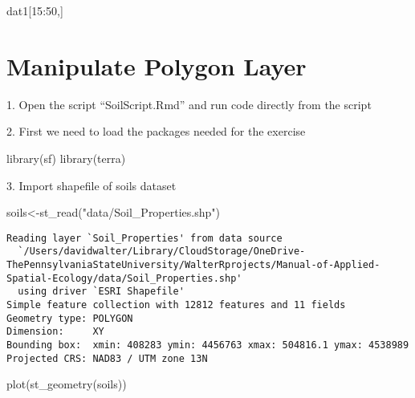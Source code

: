 \documentclass[
  letterpaper,
]{book}
\newenvironment{Shaded}{\begin{snugshade}}{\end{snugshade}}
\newcommand{\DecValTok}[1]{\textcolor[rgb]{0.68,0.00,0.00}{#1}}
\newcommand{\FunctionTok}[1]{\textcolor[rgb]{0.28,0.35,0.67}{#1}}
\newcommand{\NormalTok}[1]{\textcolor[rgb]{0.00,0.23,0.31}{#1}}
\newcommand{\OtherTok}[1]{\textcolor[rgb]{0.00,0.23,0.31}{#1}}
\newcommand{\SpecialCharTok}[1]{\textcolor[rgb]{0.37,0.37,0.37}{#1}}
\newcommand{\StringTok}[1]{\textcolor[rgb]{0.13,0.47,0.30}{#1}}
\begin{document}
\begin{Shaded}
\begin{Highlighting}[]
\NormalTok{dat1[}\DecValTok{15}\SpecialCharTok{:}\DecValTok{50}\NormalTok{,]}
\end{Highlighting}
\end{Shaded}

\hypertarget{manipulate-polygon-layer}{%
\chapter{Manipulate Polygon Layer}\label{manipulate-polygon-layer}}

1. Open the script ``SoilScript.Rmd'' and run code directly from the
script

2. First we need to load the packages needed for the exercise

\begin{Shaded}
\begin{Highlighting}[]
\FunctionTok{library}\NormalTok{(sf)}
\FunctionTok{library}\NormalTok{(terra)}
\end{Highlighting}
\end{Shaded}

3. Import shapefile of soils dataset

\begin{Shaded}
\begin{Highlighting}[]
\NormalTok{soils}\OtherTok{\textless{}{-}}\FunctionTok{st\_read}\NormalTok{(}\StringTok{"data/Soil\_Properties.shp"}\NormalTok{)}
\end{Highlighting}
\end{Shaded}

\begin{verbatim}
Reading layer `Soil_Properties' from data source 
  `/Users/davidwalter/Library/CloudStorage/OneDrive-ThePennsylvaniaStateUniversity/WalterRprojects/Manual-of-Applied-Spatial-Ecology/data/Soil_Properties.shp' 
  using driver `ESRI Shapefile'
Simple feature collection with 12812 features and 11 fields
Geometry type: POLYGON
Dimension:     XY
Bounding box:  xmin: 408283 ymin: 4456763 xmax: 504816.1 ymax: 4538989
Projected CRS: NAD83 / UTM zone 13N
\end{verbatim}

\begin{Shaded}
\begin{Highlighting}[]
\FunctionTok{plot}\NormalTok{(}\FunctionTok{st\_geometry}\NormalTok{(soils))}
\end{Highlighting}
\end{Shaded}
\end{document}

